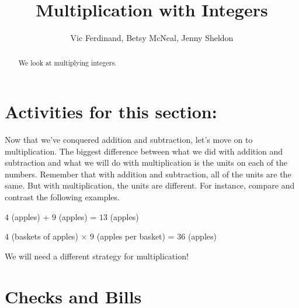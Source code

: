 \documentclass{ximera}
\title{Multiplication with Integers}
\author{Vic Ferdinand, Betsy McNeal, Jenny Sheldon}
\begin{document}
\begin{abstract}
We look at multiplying integers.
\end{abstract}
\maketitle

\section{Activities for this section:}


Now that we've conquered addition and subtraction, let's move on to multiplication.  The biggest difference between what we did with addition and subtraction and what we will do with multiplication is the units on each of the numbers. Remember that with addition and subtraction, all of the units are the same. But with multiplication, the units are different. For instance, compare and contrast the following examples.
\begin{center}
    $4$ (apples) + $9$ (apples) = $13$ (apples)
    
    $4$ (baskets of apples) $\times$ $9$ (apples per basket) = $36$ (apples)
\end{center}
We will need a different strategy for multiplication!

\section{Checks and Bills}

%
%
%
\end{document}
